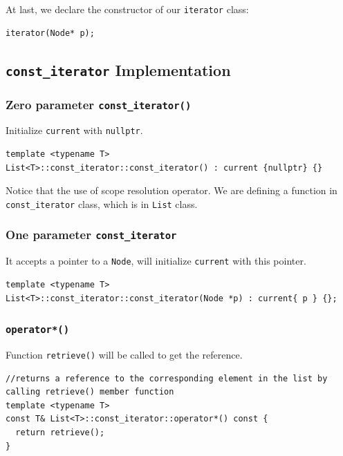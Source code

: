 \documentclass[11pt]{book}
\begin{document}
At last, we declare the constructor of our \texttt{iterator} class:
\begin{verbatim}
iterator(Node* p);
\end{verbatim}
\subsection{\texttt{const\_iterator} Implementation}
\label{sec:orgda3bd4a}
\subsubsection{Zero parameter \texttt{const\_iterator()}}
\label{sec:orge1978f5}
Initialize \texttt{current} with \texttt{nullptr}.
\begin{verbatim}
template <typename T>
List<T>::const_iterator::const_iterator() : current {nullptr} {}
\end{verbatim}

Notice that the use of scope resolution operator. We are defining a function in \texttt{const\_iterator} class, which is in \texttt{List} class.
\subsubsection{One parameter \texttt{const\_iterator}}
\label{sec:orgc32bc09}
It accepts a pointer to a \texttt{Node}, will initialize \texttt{current} with this pointer.
\begin{verbatim}
template <typename T>
List<T>::const_iterator::const_iterator(Node *p) : current{ p } {};
\end{verbatim}

\subsubsection{\texttt{operator*()}}
\label{sec:org1db0791}
Function \texttt{retrieve()} will be called to get the reference.
\begin{verbatim}
//returns a reference to the corresponding element in the list by calling retrieve() member function
template <typename T>
const T& List<T>::const_iterator::operator*() const {
  return retrieve();
}
\end{verbatim}
\end{document}
